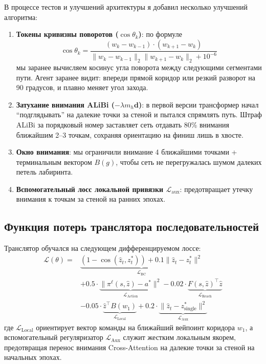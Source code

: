 В процессе тестов и улучшений архитектуры я добавил несколько улучшений алгоритма:
\begin{enumerate}[leftmargin=*,noitemsep]
    \item \textbf{Токены кривизны поворотов ($\cos \theta_k$)}: по формуле
    \begin{equation}
        \label{eq:curvature_angle}
        \cos \theta_k = \frac{(w_k - w_{k-1}) \cdot (w_{k+1} - w_k)}{\|w_k - w_{k-1}\|_2 \|w_{k+1} - w_k\|_2 + 10^{-6}}
    \end{equation}
    мы заранее вычисляем косинус угла поворота между следующими сегментами пути.  Агент заранее видит: впереди прямой коридор или резкий разворот на 90 градусов, и плавно меняет угол захода.
    \item \textbf{Затухание внимания ALiBi ($-\lambda m_h \mathbf{d}$)}: в первой версии трансформер начал \enquote{подглядывать} на далекие точки за стеной и пытался спрямлять путь. Штраф ALiBi за порядковый номер заставляет сеть отдавать 80\% внимания ближайшим 2--3 точкам, сохраняя ориентацию на финиш лишь в хвосте.
    \item \textbf{Окно внимания}: мы ограничили внимание 4 ближайшими точками + терминальным вектором $B(g)$, чтобы сеть не перегружалась шумом далеких петель лабиринта.
    \item \textbf{Вспомогательный лосс локальной привязки $\mathcal{L}_{\text{aux}}$}: предотвращает утечку внимания к точкам за стеной на ранних эпохах.
\end{enumerate}

\subsection{Функция потерь транслятора последовательностей}

Транслятор обучался на следующем дифференцируемом лоссе:
\begin{equation}
\label{eq:seq_loss}
\begin{split}
\mathcal{L}(\theta) = {} & \underbrace{(1 - \cos(\hat{z}_t, z^*_t)) + 0.1 \|\hat{z}_t - z^*_t\|^2}_{\mathcal{L}_{\text{BC}}} \\
& + 0.5 \cdot \underbrace{\|\pi^\ell(s, \hat{z}) - a^*\|^2}_{\mathcal{L}_{\text{Action}}} - 0.02 \cdot \underbrace{F(s, \hat{z})^\top \hat{z}}_{\mathcal{L}_{\text{Reach}}} \\
& - 0.05 \cdot \underbrace{\hat{z}^\top B(w_1)}_{\mathcal{L}_{\text{Local}}} + 0.2 \cdot \underbrace{\|\hat{z}_t - z^*_{\text{single}}\|^2}_{\mathcal{L}_{\text{Aux}}}
\end{split}
\end{equation}
где $\mathcal{L}_{\text{Local}}$ ориентирует вектор команды на ближайший вейпоинт коридора $w_1$, а вспомогательный регуляризатор $\mathcal{L}_{\text{Aux}}$ служит жестким локальным якорем, предотвращая перенос внимания Cross-Attention на далекие точки за стеной на начальных эпохах.
